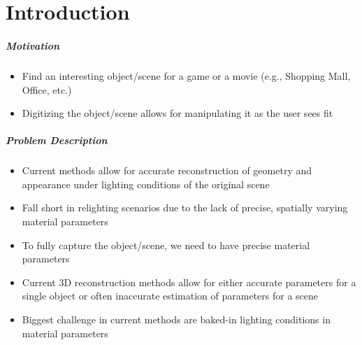 \chapter{Introduction}
\label{chap:introduction}
\paragraph{Motivation}
\begin{itemize}
    \item Find an interesting object/scene for a game or a movie (e.g., Shopping Mall, Office, etc.)
    \item Digitizing the object/scene allows for manipulating it as the user sees fit
\end{itemize}

\paragraph{Problem Description}
\begin{itemize}
    \item Current methods allow for accurate reconstruction of geometry and appearance under lighting conditions of the original scene
    \item Fall short in relighting scenarios due to the lack of precise, spatially varying material parameters
    \item To fully capture the object/scene, we need to have precise material parameters
    \item Current 3D reconstruction methods allow for either accurate parameters for a single object or often inaccurate estimation of parameters for a scene
    \item Biggest challenge in current methods are baked-in lighting conditions in material parameters
\end{itemize}

